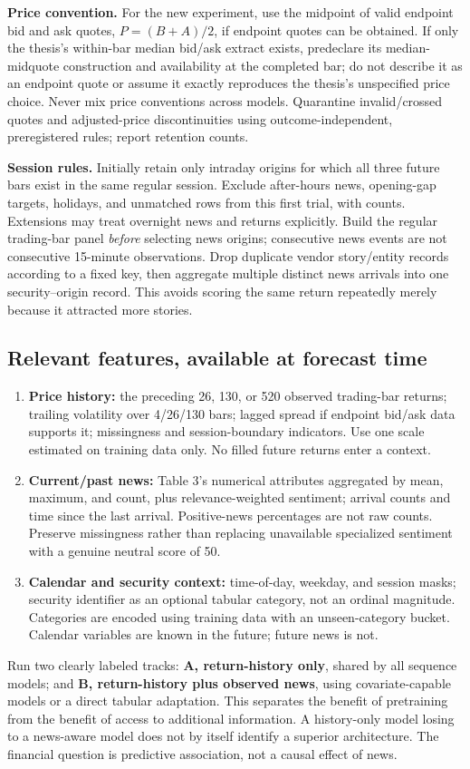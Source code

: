 \documentclass[11pt,letterpaper]{article}
\begin{document}
\textbf{Price convention.} For the new experiment, use the midpoint of valid endpoint bid and ask quotes, $P=(B+A)/2$, if endpoint quotes can be obtained. If only the thesis's within-bar median bid/ask extract exists, predeclare its median-midquote construction and availability at the completed bar; do not describe it as an endpoint quote or assume it exactly reproduces the thesis's unspecified price choice. Never mix price conventions across models. Quarantine invalid/crossed quotes and adjusted-price discontinuities using outcome-independent, preregistered rules; report retention counts.

\textbf{Session rules.} Initially retain only intraday origins for which all three future bars exist in the same regular session. Exclude after-hours news, opening-gap targets, holidays, and unmatched rows from this first trial, with counts. Extensions may treat overnight news and returns explicitly. Build the regular trading-bar panel \emph{before} selecting news origins; consecutive news events are not consecutive 15-minute observations. Drop duplicate vendor story/entity records according to a fixed key, then aggregate multiple distinct news arrivals into one security--origin record. This avoids scoring the same return repeatedly merely because it attracted more stories.

\subsection{Relevant features, available at forecast time}
\begin{enumerate}
\item \textbf{Price history:} the preceding 26, 130, or 520 observed trading-bar returns; trailing volatility over 4/26/130 bars; lagged spread if endpoint bid/ask data supports it; missingness and session-boundary indicators. Use one scale estimated on training data only. No filled future returns enter a context.
\item \textbf{Current/past news:} Table 3's numerical attributes aggregated by mean, maximum, and count, plus relevance-weighted sentiment; arrival counts and time since the last arrival. Positive-news percentages are not raw counts. Preserve missingness rather than replacing unavailable specialized sentiment with a genuine neutral score of 50.
\item \textbf{Calendar and security context:} time-of-day, weekday, and session masks; security identifier as an optional tabular category, not an ordinal magnitude. Categories are encoded using training data with an unseen-category bucket. Calendar variables are known in the future; future news is not.
\end{enumerate}
Run two clearly labeled tracks: \textbf{A, return-history only}, shared by all sequence models; and \textbf{B, return-history plus observed news}, using covariate-capable models or a direct tabular adaptation. This separates the benefit of pretraining from the benefit of access to additional information. A history-only model losing to a news-aware model does not by itself identify a superior architecture. The financial question is predictive association, not a causal effect of news.
\end{document}
